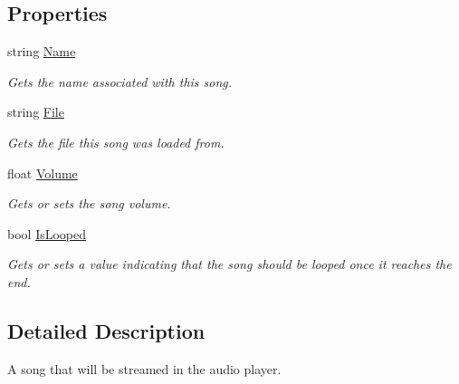 \subsection*{Properties}
\begin{DoxyCompactItemize}
\item 
string \hyperlink{interface_tri_devs_1_1_tri_engine2_d_1_1_audio_1_1_i_song_ad14836f818a4e0d63c9a341c2159250a}{Name}
\begin{DoxyCompactList}\small\item\em Gets the name associated with this song. \end{DoxyCompactList}\item 
string \hyperlink{interface_tri_devs_1_1_tri_engine2_d_1_1_audio_1_1_i_song_a5610c3ab21ec36403c5a632a24a57c54}{File}
\begin{DoxyCompactList}\small\item\em Gets the file this song was loaded from. \end{DoxyCompactList}\item 
float \hyperlink{interface_tri_devs_1_1_tri_engine2_d_1_1_audio_1_1_i_song_aaf0addd47d248155a74d9cb9eca8fa4b}{Volume}
\begin{DoxyCompactList}\small\item\em Gets or sets the song volume. \end{DoxyCompactList}\item 
bool \hyperlink{interface_tri_devs_1_1_tri_engine2_d_1_1_audio_1_1_i_song_a6a5eeb5f1f6418fda045baeba034e734}{Is\-Looped}
\begin{DoxyCompactList}\small\item\em Gets or sets a value indicating that the song should be looped once it reaches the end. \end{DoxyCompactList}\end{DoxyCompactItemize}


\subsection{Detailed Description}
A song that will be streamed in the audio player. 



